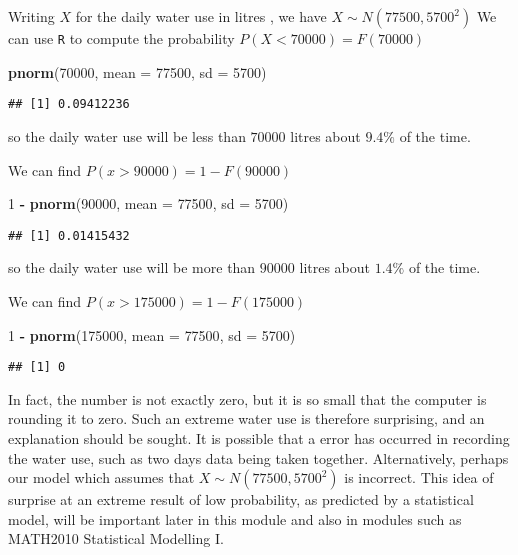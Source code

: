 \documentclass[]{book}
\newenvironment{Shaded}{\begin{snugshade}}{\end{snugshade}}
\newcommand{\KeywordTok}[1]{\textcolor[rgb]{0.13,0.29,0.53}{\textbf{#1}}}
\newcommand{\DataTypeTok}[1]{\textcolor[rgb]{0.13,0.29,0.53}{#1}}
\newcommand{\DecValTok}[1]{\textcolor[rgb]{0.00,0.00,0.81}{#1}}
\newcommand{\StringTok}[1]{\textcolor[rgb]{0.31,0.60,0.02}{#1}}
\newcommand{\OperatorTok}[1]{\textcolor[rgb]{0.81,0.36,0.00}{\textbf{#1}}}
\newcommand{\NormalTok}[1]{#1}
\theoremstyle{definition}
\theoremstyle{definition}
\theoremstyle{definition}
\theoremstyle{remark}
\begin{document}
Writing \(X\) for the daily water use in litres , we have
\(X \sim N(77500, 5700^2)\) We can use \texttt{R} to compute the
probability \(P(X < 70000) = F(70000)\)

\begin{Shaded}
\begin{Highlighting}[]
\KeywordTok{pnorm}\NormalTok{(}\DecValTok{70000}\NormalTok{, }\DataTypeTok{mean =} \DecValTok{77500}\NormalTok{, }\DataTypeTok{sd =} \DecValTok{5700}\NormalTok{)}
\end{Highlighting}
\end{Shaded}

\begin{verbatim}
## [1] 0.09412236
\end{verbatim}

so the daily water use will be less than \(70000\) litres about
\(9.4\%\) of the time.

We can find \(P(x > 90000) = 1 - F(90000)\)

\begin{Shaded}
\begin{Highlighting}[]
\DecValTok{1} \OperatorTok{-}\StringTok{ }\KeywordTok{pnorm}\NormalTok{(}\DecValTok{90000}\NormalTok{, }\DataTypeTok{mean =} \DecValTok{77500}\NormalTok{, }\DataTypeTok{sd =} \DecValTok{5700}\NormalTok{)}
\end{Highlighting}
\end{Shaded}

\begin{verbatim}
## [1] 0.01415432
\end{verbatim}

so the daily water use will be more than \(90000\) litres about
\(1.4\%\) of the time.

We can find \(P(x > 175000) = 1 - F(175000)\)

\begin{Shaded}
\begin{Highlighting}[]
\DecValTok{1} \OperatorTok{-}\StringTok{ }\KeywordTok{pnorm}\NormalTok{(}\DecValTok{175000}\NormalTok{, }\DataTypeTok{mean =} \DecValTok{77500}\NormalTok{, }\DataTypeTok{sd =} \DecValTok{5700}\NormalTok{)}
\end{Highlighting}
\end{Shaded}

\begin{verbatim}
## [1] 0
\end{verbatim}

In fact, the number is not exactly zero, but it is so small that the
computer is rounding it to zero. Such an extreme water use is therefore
surprising, and an explanation should be sought. It is possible that a
error has occurred in recording the water use, such as two days data
being taken together. Alternatively, perhaps our model which assumes
that \(X \sim N(77500, 5700^2)\) is incorrect. This idea of surprise at
an extreme result of low probability, as predicted by a statistical
model, will be important later in this module and also in modules such
as MATH2010 Statistical Modelling I.
\end{document}
